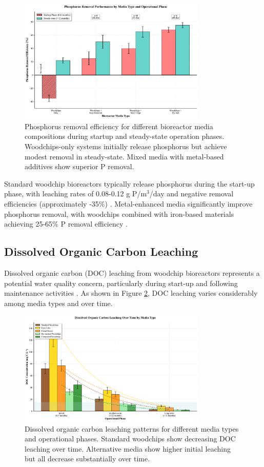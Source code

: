 \documentclass[12pt,a4paper]{article}
\begin{document}
\begin{figure}[ht]
\centering
\includegraphics[width=0.8\textwidth]{fig7_phosphorus_scientific}
\caption{Phosphorus removal efficiency for different bioreactor media compositions during startup and steady-state operation phases. Woodchips-only systems initially release phosphorus but achieve modest removal in steady-state. Mixed media with metal-based additives show superior P removal.}
\label{fig:phosphorus_removal}
\end{figure}

Standard woodchip bioreactors typically release phosphorus during the start-up phase, with leaching rates of 0.08-0.12 g P/m$^3$/day and negative removal efficiencies (approximately -35\%) \citep{RN291}. Metal-enhanced media significantly improve phosphorus removal, with woodchips combined with iron-based materials achieving 25-65\% P removal efficiency \citep{RN370}.

\subsection{Dissolved Organic Carbon Leaching}

Dissolved organic carbon (DOC) leaching from woodchip bioreactors represents a potential water quality concern, particularly during start-up and following maintenance activities \citep{RN291, RN242}. As shown in Figure \ref{fig:doc_leaching}, DOC leaching varies considerably among media types and over time.

\begin{figure}[ht]
\centering
\includegraphics[width=0.8\textwidth]{fig8_doc_leaching_scientific}
\caption{Dissolved organic carbon leaching patterns for different media types and operational phases. Standard woodchips show decreasing DOC leaching over time. Alternative media show higher initial leaching but all decrease substantially over time.}
\label{fig:doc_leaching}
\end{figure}
\end{document}

